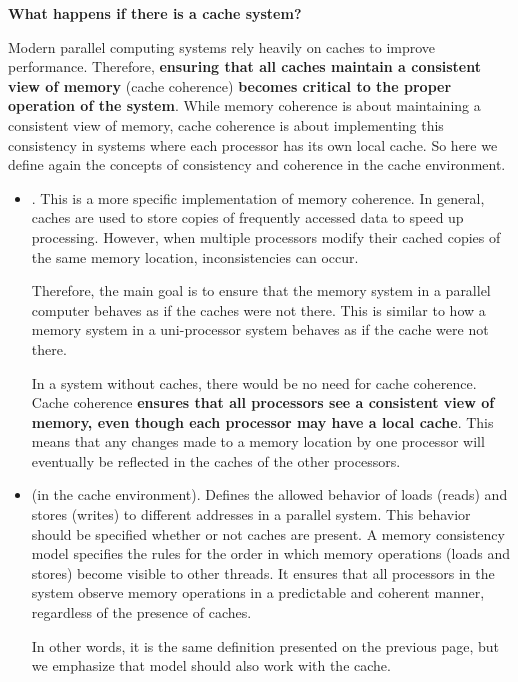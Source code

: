 \highspace
\begin{flushleft}
    \textcolor{Green3}{ \textbf{What happens if there is a cache system?}}
\end{flushleft}
Modern parallel computing systems rely heavily on caches to improve performance. Therefore, \textbf{ensuring that all caches maintain a consistent view of memory} (cache coherence) \textbf{becomes critical to the proper operation of the system}. While memory coherence is about maintaining a consistent view of memory, cache coherence is about implementing this consistency in systems where each processor has its own local cache. So here we define again the concepts of consistency and coherence in the cache environment.
\begin{itemize}
    \item {}. This is a more specific implementation of memory coherence. In general, caches are used to store copies of frequently accessed data to speed up processing. However, when multiple processors modify their cached copies of the same memory location, inconsistencies can occur.
    
    Therefore, the main goal is to ensure that the memory system in a parallel computer behaves as if the caches were not there. This is similar to how a memory system in a uni-processor system behaves as if the cache were not there.

    In a system without caches, there would be no need for cache coherence. Cache coherence \textbf{ensures that all processors see a consistent view of memory, even though each processor may have a local cache}. This means that any changes made to a memory location by one processor will eventually be reflected in the caches of the other processors.

    
    \item {} (in the cache environment). Defines the allowed behavior of loads (reads) and stores (writes) to different addresses in a parallel system. This behavior should be specified whether or not caches are present. A memory consistency model specifies the rules for the order in which memory operations (loads and stores) become visible to other threads. It ensures that all processors in the system observe memory operations in a predictable and coherent manner, regardless of the presence of caches.

    In other words, it is the same definition presented on the previous page, but we emphasize that model should also work with the cache.
\end{itemize}
